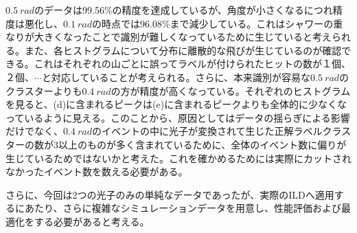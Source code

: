 $\SI{0.5}{rad}$のデータは99.56\%の精度を達成しているが、角度が小さくなるにつれ精度は悪化し、$\SI{0.1}{rad}$の時点では96.08\%まで減少している。これはシャワーの重なりが大きくなったことで識別が難しくなっているために生じていると考えられる。また、各ヒストグラムについて分布に離散的な飛びが生じているのが確認できる。これはそれぞれの山ごとに誤ってラベルが付けられたヒットの数が１個、２個、$\cdots$と対応していることが考えられる。さらに、本来識別が容易な$\SI{0.5}{rad}$のクラスターよりも$\SI{0.4}{rad}$の方が精度が高くなっている。それぞれのヒストグラムを見ると、(d)に含まれるピークは(e)に含まれるピークよりも全体的に少なくなっているように見える。このことから、原因としてはデータの揺らぎによる影響だけでなく、$\SI{0.4}{rad}$のイベントの中に光子が変換されて生じた正解ラベルクラスターの数が3以上のものが多く含まれているために、全体のイベント数に偏りが生じているためではないかと考えた。これを確かめるためには実際にカットされなかったイベント数を数える必要がある。

さらに、今回は2つの光子のみの単純なデータであったが、実際のILDへ適用するにあたり、さらに複雑なシミュレーションデータを用意し、性能評価および最適化をする必要があると考える。



